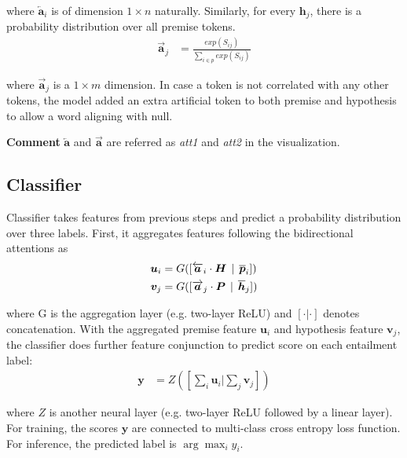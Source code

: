 \documentclass[review,journal]{vgtc}         %
\begin{document}
where $\overleftarrow{\boldsymbol{a}}_i$ is of dimension $1 \times n$ naturally. Similarly, for every $\boldsymbol{h}_j$, there is a probability distribution over all premise tokens.
\begin{align}
  \overrightarrow{\boldsymbol{a}}_j &= \frac{exp(S_{ij})}{\sum_{i \in p} exp(S_{ij})} \label{eq:aright}
\end{align}

where $\overrightarrow{\boldsymbol{a}}_j$ is a $1 \times m$ dimension. In case a token is not correlated with any other tokens, the model added an extra artificial token to both premise and hypothesis to allow a word aligning with null.

\textbf{Comment} $\overleftarrow{\boldsymbol{a}}$ and $\overrightarrow{\boldsymbol{a}}$ are referred as \emph{att1} and \emph{att2} in the visualization.

\subsection{Classifier} \label{sec:cls}
Classifier takes features from previous steps and predict a probability distribution over three labels. First, it aggregates features following the bidirectional attentions as
\begin{align}
  \boldsymbol{u}_i &= G([\overleftarrow{\boldsymbol{a}}_i \cdot \boldsymbol{H} \hspace{1ex} | \hspace{1ex}  \overline{\boldsymbol{p}}_i]) \\
  \boldsymbol{v}_j &= G([\overrightarrow{\boldsymbol{a}}_j \cdot \boldsymbol{P} \hspace{1ex}  | \hspace{1ex}  \overline{\boldsymbol{h}}_j])
\end{align}

where G is the aggregation layer (e.g. two-layer ReLU) and $[\cdot|\cdot]$ denotes concatenation. With the aggregated premise feature $\boldsymbol{u}_i$ and hypothesis feature $\boldsymbol{v}_j$, the classifier does further feature conjunction to predict score on each entailment label:
\begin{align}
  \boldsymbol{y} &= Z([\sum_i \boldsymbol{u}_i | \sum_j \boldsymbol{v}_j]) \label{eq:yscore}
\end{align}

where $Z$ is another neural layer (e.g. two-layer ReLU followed by a linear layer). For training, the scores $\boldsymbol{y}$ are connected to multi-class cross entropy loss function. For inference, the predicted label is $\arg\max_i y_i$.
\end{document}
